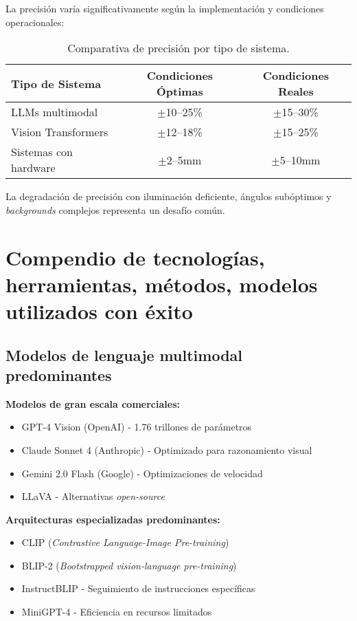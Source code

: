 La precisión varía significativamente según la implementación y condiciones operacionales:

\begin{table}[H]
\centering
\caption{Comparativa de precisión por tipo de sistema.}
\label{tab:precision_sistemas}
\begin{tabular}{@{}lcc@{}}
\toprule
\textbf{Tipo de Sistema} & \textbf{Condiciones Óptimas} & \textbf{Condiciones Reales} \\
\midrule
LLMs multimodal & $\pm$10--25\% & $\pm$15--30\% \\
Vision Transformers & $\pm$12--18\% & $\pm$15--25\% \\
Sistemas con hardware & $\pm$2--5mm & $\pm$5--10mm \\
\bottomrule
\end{tabular}
\end{table}

La degradación de precisión con iluminación deficiente, ángulos subóptimos y \textit{backgrounds} complejos representa un desafío común.

\section{Compendio de tecnologías, herramientas, métodos, modelos utilizados con éxito}

\subsection{Modelos de lenguaje multimodal predominantes}

\textbf{Modelos de gran escala comerciales:}
\begin{itemize}
    \item GPT-4 Vision (OpenAI) - 1.76 trillones de parámetros
    \item Claude Sonnet 4 (Anthropic) - Optimizado para razonamiento visual
    \item Gemini 2.0 Flash (Google) - Optimizaciones de velocidad
    \item LLaVA - Alternativas \textit{open-source}
\end{itemize}

\textbf{Arquitecturas especializadas predominantes:}
\begin{itemize}
    \item CLIP (\textit{Contrastive Language-Image Pre-training})
    \item BLIP-2 (\textit{Bootstrapped vision-language pre-training})
    \item InstructBLIP - Seguimiento de instrucciones específicas
    \item MiniGPT-4 - Eficiencia en recursos limitados
\end{itemize}

